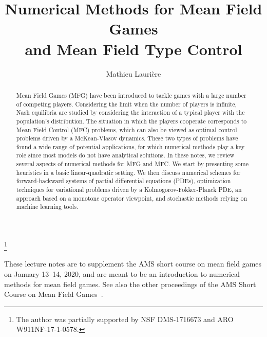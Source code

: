 \documentclass{amsproc}
\theoremstyle{definition}
\theoremstyle{remark}
\numberwithin{equation}{section}
\begin{document}
\title[Numerical methods for MFG and MFC]{Numerical Methods for Mean Field Games \\ and Mean Field Type Control}


\author{Mathieu Lauri{\`e}re}
\address{Princeton University, Operations Research and Financial Engineering (ORFE) department, Sherrerd Hall, Princeton, New Jersey, U.S.A.}
\curraddr{}
\thanks{The author was partially supported by NSF DMS-1716673 and ARO W911NF-17-1-0578.}



\date{}

\begin{abstract}
Mean Field Games (MFG) have been introduced to tackle games with a large number of competing players. Considering the limit when the number of players is infinite, Nash equilibria are studied by considering the interaction of a typical player with the population's distribution. The situation in which the players cooperate corresponds to Mean Field Control (MFC) problems, which can also be viewed as optimal control problems driven by a McKean-Vlasov dynamics. These two types of problems have found a wide range of potential applications, for which numerical methods play a key role since most models do not have analytical solutions. In these notes, we review several aspects of numerical methods for MFG and MFC. We start by presenting some heuristics in a basic linear-quadratic setting. We then discuss numerical schemes for forward-backward systems of partial differential equations (PDEs), optimization techniques for variational problems driven by a Kolmogorov-Fokker-Planck PDE, an approach based on a monotone operator viewpoint, and stochastic methods relying on machine learning tools. 
\end{abstract}

\maketitle



\setcounter{tocdepth}{2}
\tableofcontents








These lecture notes are to supplement the AMS short course on mean field games on January 13--14, 2020, and are meant to be an introduction to numerical methods for mean field games. See also the other proceedings of the AMS Short Course on Mean Field Games~\cite{carmona-AMS-tmp,delarue-AMS-tmp,gravesmalhame-AMS-tmp,lacker-AMS-tmp,ramanan-AMS-tmp}. 
\end{document}
